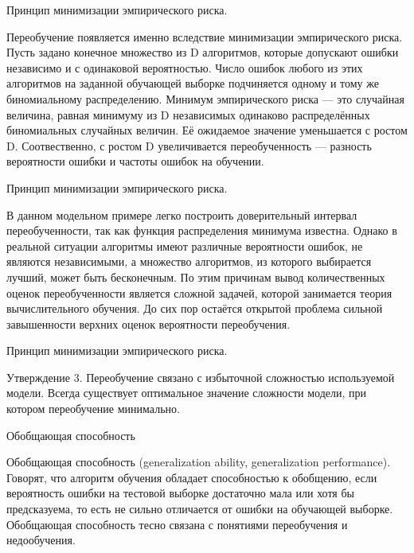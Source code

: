 \documentclass{beamer}
\begin{document}
\begin{frame}{Принцип минимизации эмпирического риска.}


 Переобучение появляется именно вследствие минимизации эмпирического риска. Пусть задано конечное множество из D алгоритмов, 
которые допускают ошибки независимо и с одинаковой вероятностью. Число ошибок любого из этих алгоритмов 
на заданной обучающей выборке подчиняется одному и тому же биномиальному распределению.
 Минимум эмпирического риска — это случайная величина, равная минимуму из D 
 независимых одинаково распределённых биномиальных случайных величин. 
 Её ожидаемое значение уменьшается с ростом D. Соотвественно, с ростом D увеличивается 
 переобученность — разность вероятности ошибки и частоты ошибок на обучении.
 
\end{frame}

\begin{frame}{Принцип минимизации эмпирического риска.}

В данном модельном примере легко построить доверительный интервал переобученности, так как функция распределения минимума известна.
 Однако в реальной ситуации алгоритмы имеют различные вероятности ошибок, не являются независимыми,
  а множество алгоритмов, из которого выбирается лучший, может быть бесконечным.
   По этим причинам вывод количественных оценок переобученности является сложной задачей,
    которой занимается теория вычислительного обучения. До сих пор остаётся открытой 
    проблема сильной завышенности верхних оценок вероятности переобучения.
    
\end{frame}

\begin{frame}{Принцип минимизации эмпирического риска.}

Утверждение 3. Переобучение связано с избыточной сложностью используемой модели. Всегда существует оптимальное значение сложности модели, при котором переобучение минимально. 

\end{frame}

\begin{frame}{Обобщающая способность}

Обобщающая способность (generalization ability, generalization performance). Говорят, что алгоритм обучения обладает способностью к обобщению, если вероятность ошибки на тестовой выборке достаточно мала или хотя бы предсказуема, то есть не сильно отличается от ошибки на обучающей выборке. Обобщающая способность тесно связана с понятиями переобучения и недообучения.
\end{frame}
\end{document}
